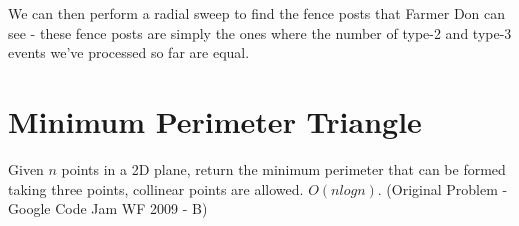     We can then perform a radial sweep to find the fence posts that Farmer Don can see - these fence posts are simply the ones where the number of type-2 and type-3 events we've processed so far are equal.
        
        
    \section{Minimum Perimeter Triangle}
    Given $n$ points in a 2D plane, return the minimum perimeter that can be formed taking three points, collinear points are allowed. $O(nlogn)$. (Original Problem - Google Code Jam WF 2009 - B)
    
    
    
    